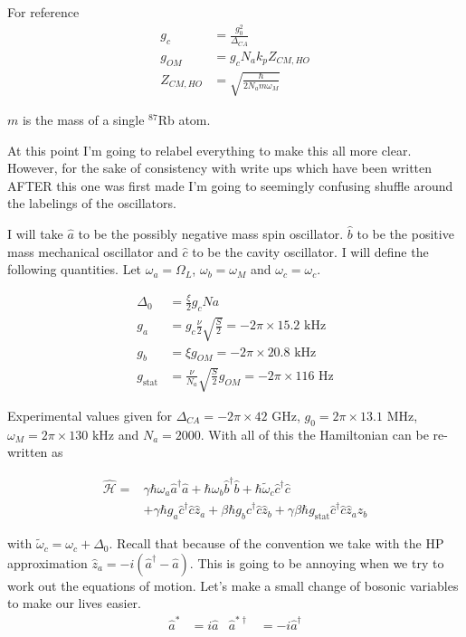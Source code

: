 \documentclass[12pt]{article}
\begin{document}
For reference
\begin{align}
g_c &= \frac{g_0^2}{\Delta_{CA}}\\
g_{OM} &= g_c N_a k_p Z_{CM,HO}\\
Z_{CM,HO} &= \sqrt{\frac{\hbar}{2 N_a m \omega_M}}
\end{align}

$m$ is the mass of a single $^{87}$Rb atom.

At this point I'm going to relabel everything to make this all more clear. However, for the sake of consistency with write ups which have been written AFTER this one was first made I'm going to seemingly confusing shuffle around the labelings of the oscillators.

I will take $\hat{a}$ to be the possibly negative mass spin oscillator. $\hat{b}$ to be the positive mass mechanical oscillator and $\hat{c}$ to be the cavity oscillator. I will define the following quantities. Let $\omega_a = \Omega_L$, $\omega_b=\omega_M$ and $\omega_c = \omega_c$.

\begin{align}
\Delta_0 &= \frac{\xi}{2}g_c Na\\
g_{a} &= g_c \frac{\nu}{2}\sqrt{\frac{S}{2}} = -2\pi \times 15.2 \text{ kHz}\\
g_{b} &= \xi g_{OM} = -2\pi \times 20.8 \text{ kHz}\\
g_{\text{stat}} &= \frac{\nu}{N_a}\sqrt{\frac{S}{2}}g_{OM} = -2\pi \times 116 \text{ Hz}
\end{align}

Experimental values given for $\Delta_{CA} = -2 \pi \times 42 \text{ GHz}$, $g_0 = 2 \pi \times 13.1 \text{ MHz}$, $\omega_M = 2\pi \times 130 \text{ kHz}$ and $N_a = 2000$.
With all of this the Hamiltonian can be re-written as

\begin{align}
\widehat{\mathcal{H}} =& \gamma \hbar \omega_a\hat{a}^{\dag}\hat{a} + \hbar \omega_b \hat{b}^{\dag}\hat{b} + \hbar\tilde{\omega}_c\hat{c}^{\dag} \hat{c}\\
&+\gamma \hbar g_{a} \hat{c}^{\dag}\hat{c} \hat{z}_a +
\beta \hbar g_{b} \hat{c}^{\dag} \hat{c} \hat{z}_b +  \gamma \beta \hbar g_{\text{stat}} \hat{c}^{\dag} \hat{c} \hat{z}_a \hat{z}_b
\end{align}

with $\tilde{\omega}_c=\omega_c+\Delta_0$.
Recall that because of the convention we take with the HP approximation $\hat{z}_a = -i(\hat{a}^{\dag}-\hat{a})$. This is going to be annoying when we try to work out the equations of motion. Let's make a small change of bosonic variables to make our lives easier.
\begin{align}
\hat{a}^* &= i\hat{a}  &\hat{a}^{*\dag} &= -i\hat{a}^{\dag}\\
\end{align}
\end{document}
